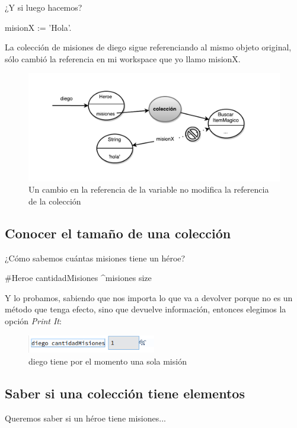 \documentclass[a4paper,12pt]{book}
\begin{document}
¿Y si luego hacemos?

\begin{code}
misionX := 'Hola'.
\end{code}

\vspace{\baselineskip}
La colección de misiones de diego sigue referenciando al mismo objeto original, sólo cambió la referencia
en mi workspace que yo llamo misionX.

\begin{figure}[h!]
    \centering	
    \includegraphics[width=1\textwidth]{images/31_Referencias_colecciones.pdf}
    \caption{Un cambio en la referencia de la variable no modifica la referencia de la colección}
\end{figure}
\FloatBarrier


\subsection{Conocer el tamaño de una colección}
¿Cómo sabemos cuántas misiones tiene un héroe?

\begin{code}
#Heroe
cantidadMisiones
    ^misiones size
\end{code}

Y lo probamos, sabiendo que nos importa lo que va a devolver porque no es un método que tenga efecto, sino que
devuelve información, entonces elegimos la opción \textit{Print It}:

\begin{figure}[h!]
    \centering	
    \includegraphics[width=0.5\textwidth]{images/15_diego_cantidadMisiones.png}
    \caption{diego tiene por el momento una sola misión}
\end{figure}
\FloatBarrier

\subsection{Saber si una colección tiene elementos}
Queremos saber si un héroe tiene misiones...
\end{document}
